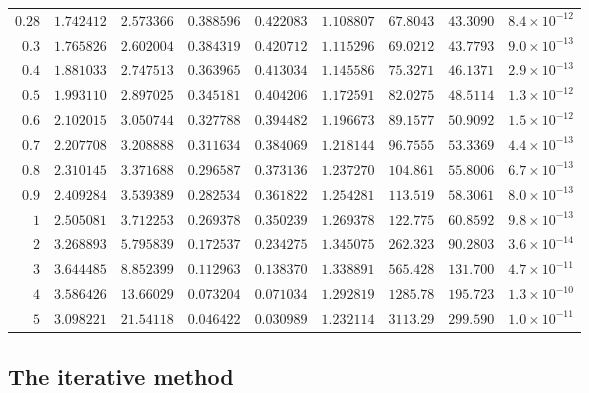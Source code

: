 \documentclass[12pt]{extarticle}
\theoremstyle{plain}
\theoremstyle{remark}
\begin{document}
{\begin{longtable}{rcccccccc}
$0.28$ & $1.742412$ & $2.573366$ & $0.388596$ & $0.422083$ & $1.108807$ & $67.8043$ & $43.3090$ & $8.4\times10^{-12}$ \\
$0.3$ & $1.765826$ & $2.602004$ & $0.384319$ & $0.420712$ & $1.115296$ & $69.0212$ & $43.7793$ & $9.0\times10^{-13}$ \\
$0.4$ & $1.881033$ & $2.747513$ & $0.363965$ & $0.413034$ & $1.145586$ & $75.3271$ & $46.1371$ & $2.9\times10^{-13}$ \\
$0.5$ & $1.993110$ & $2.897025$ & $0.345181$ & $0.404206$ & $1.172591$ & $82.0275$ & $48.5114$ & $1.3\times10^{-12}$ \\
$0.6$ & $2.102015$ & $3.050744$ & $0.327788$ & $0.394482$ & $1.196673$ & $89.1577$ & $50.9092$ & $1.5\times10^{-12}$ \\
$0.7$ & $2.207708$ & $3.208888$ & $0.311634$ & $0.384069$ & $1.218144$ & $96.7555$ & $53.3369$ & $4.4\times10^{-13}$ \\
$0.8$ & $2.310145$ & $3.371688$ & $0.296587$ & $0.373136$ & $1.237270$ & $104.861$ & $55.8006$ & $6.7\times10^{-13}$ \\
$0.9$ & $2.409284$ & $3.539389$ & $0.282534$ & $0.361822$ & $1.254281$ & $113.519$ & $58.3061$ & $8.0\times10^{-13}$ \\
$1$ & $2.505081$ & $3.712253$ & $0.269378$ & $0.350239$ & $1.269378$ & $122.775$ & $60.8592$ & $9.8\times10^{-13}$ \\
$2$ & $3.268893$ & $5.795839$ & $0.172537$ & $0.234275$ & $1.345075$ & $262.323$ & $90.2803$ & $3.6\times10^{-14}$ \\
$3$ & $3.644485$ & $8.852399$ & $0.112963$ & $0.138370$ & $1.338891$ & $565.428$ & $131.700$ & $4.7\times10^{-11}$ \\
$4$ & $3.586426$ & $13.66029$ & $0.073204$ & $0.071034$ & $1.292819$ & $1285.78$ & $195.723$ & $1.3\times10^{-10}$ \\
$5$ & $3.098221$ & $21.54118$ & $0.046422$ & $0.030989$ & $1.232114$ & $3113.29$ & $299.590$ & $1.0\times10^{-11}$ \\
\end{longtable}
}

\clearpage
\subsection*{The iterative method}
\end{document}
